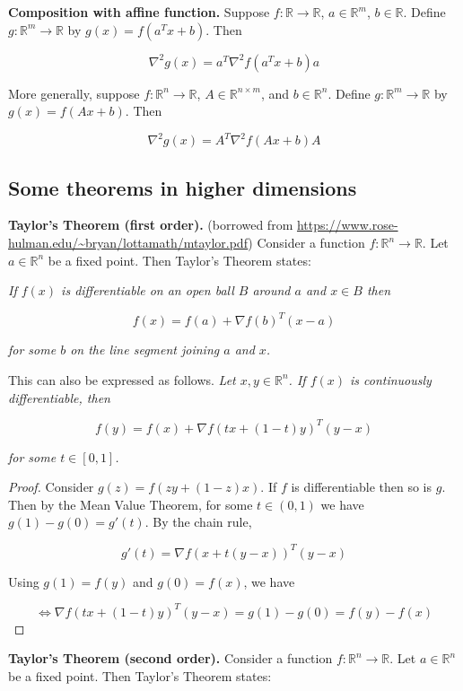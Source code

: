 \textbf{Composition with affine function.} Suppose  \(f: \mathbb{R} \to \mathbb{R}\), \(a \in \mathbb{R}^m\), \(b \in \mathbb{R}\). Define \(g: \mathbb{R}^m \to \mathbb{R}\) by \(g(x) = f(a^Tx + b)\). Then

\[
\nabla^2 g(x) = a^T \nabla^2 f(a^Tx + b) a
\]


More generally, suppose  \(f: \mathbb{R}^n \to \mathbb{R}\), \(A \in \mathbb{R}^{n \times m}\), and \(b \in \mathbb{R}^n\). Define \(g: \mathbb{R}^m \to \mathbb{R}\) by \(g(x) = f(Ax + b)\). Then

\[
\nabla^2 g(x) = A^T \nabla^2 f(Ax + b) A
\]

\subsection{Some theorems in higher dimensions}

\textbf{Taylor's Theorem (first order).} (borrowed from \url{https://www.rose-hulman.edu/~bryan/lottamath/mtaylor.pdf}) Consider a function \(f: \mathbb{R}^n \to \mathbb{R}\). Let \(a \in \mathbb{R}^n\) be a fixed point. Then Taylor's Theorem states:

\textit{If \(f(x)\) is differentiable on an open ball \(B\) around \(a\) and \(x \in B\) then}

\[
f(x) = f(a) + \nabla f(b)^T(x - a)
\]

\textit{for some \(b\) on the line segment joining \(a\) and \(x\).} 

This can also be expressed as follows. \textit{Let \(x, y \in \mathbb{R}^n\). If \(f(x)\) is continuously differentiable, then}

\[
f(y) = f(x) + \nabla f(tx + (1-t)y)^T  (y - x)
\]

\textit{for some \(t \in [0, 1]\).} 

\begin{proof}
Consider \(g(z) = f(zy + (1-z)x)\). If \(f\) is differentiable then so is \(g\). Then by the Mean Value Theorem, for some \(t \in (0, 1)\) we have \(g(1) - g(0) = g'(t)\). By the chain rule,

\[
g'(t) = \nabla f(x + t(y - x))^T (y - x)
\]

Using \(g(1) = f(y)\) and \(g(0) = f(x)\), we have

\[
\iff  \nabla f(tx + (1-t)y)^T (y - x) = g(1) - g(0) = f(y) - f(x)
\]
\end{proof}

\textbf{Taylor's Theorem (second order).} Consider a function \(f: \mathbb{R}^n \to \mathbb{R}\). Let \(a \in \mathbb{R}^n\) be a fixed point. Then Taylor's Theorem states:

